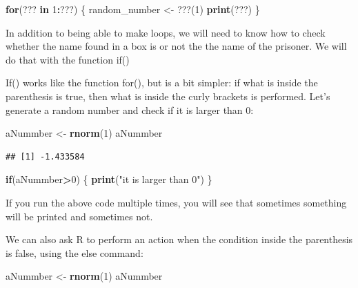 \documentclass[]{book}
\newenvironment{Shaded}{\begin{snugshade}}{\end{snugshade}}
\newcommand{\ControlFlowTok}[1]{\textcolor[rgb]{0.13,0.29,0.53}{\textbf{#1}}}
\newcommand{\DecValTok}[1]{\textcolor[rgb]{0.00,0.00,0.81}{#1}}
\newcommand{\KeywordTok}[1]{\textcolor[rgb]{0.13,0.29,0.53}{\textbf{#1}}}
\newcommand{\NormalTok}[1]{#1}
\newcommand{\OperatorTok}[1]{\textcolor[rgb]{0.81,0.36,0.00}{\textbf{#1}}}
\newcommand{\StringTok}[1]{\textcolor[rgb]{0.31,0.60,0.02}{#1}}
\begin{document}
\begin{Shaded}
\begin{Highlighting}[]
\ControlFlowTok{for}\NormalTok{(??? }\ControlFlowTok{in} \DecValTok{1}\OperatorTok{:}\NormalTok{???) \{}
\NormalTok{  random_number <-}\StringTok{ }\NormalTok{???(}\DecValTok{1}\NormalTok{)}
  \KeywordTok{print}\NormalTok{(???)}
\NormalTok{\}}
\end{Highlighting}
\end{Shaded}

In addition to being able to make loops, we will need to know how to check whether the name found in a box is or not the the name of the prisoner. We will do that with the function if()

If() works like the function for(), but is a bit simpler: if what is inside the parenthesis is true, then what is inside the curly brackets is performed. Let's generate a random number and check if it is larger than 0:

\begin{Shaded}
\begin{Highlighting}[]
\NormalTok{aNummber <-}\StringTok{ }\KeywordTok{rnorm}\NormalTok{(}\DecValTok{1}\NormalTok{)}
\NormalTok{aNummber}
\end{Highlighting}
\end{Shaded}

\begin{verbatim}
## [1] -1.433584
\end{verbatim}

\begin{Shaded}
\begin{Highlighting}[]
\ControlFlowTok{if}\NormalTok{(aNummber}\OperatorTok{>}\DecValTok{0}\NormalTok{) \{}
  \KeywordTok{print}\NormalTok{(}\StringTok{"it is larger than 0"}\NormalTok{)}
\NormalTok{\}}
\end{Highlighting}
\end{Shaded}

If you run the above code multiple times, you will see that sometimes something will be printed and sometimes not.

We can also ask R to perform an action when the condition inside the parenthesis is false, using the else command:

\begin{Shaded}
\begin{Highlighting}[]
\NormalTok{aNummber <-}\StringTok{ }\KeywordTok{rnorm}\NormalTok{(}\DecValTok{1}\NormalTok{)}
\NormalTok{aNummber}
\end{Highlighting}
\end{Shaded}
\end{document}
